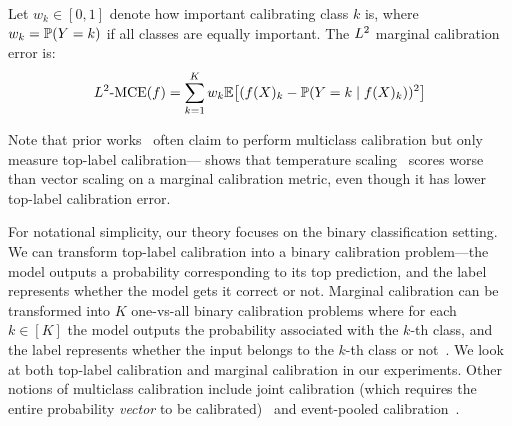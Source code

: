 \begin{definition}
\label{dfn:marginal-ce}
Let $w_k \in [0, 1]$ denote how important calibrating class $k$ is, where $w_k = \mathbb{P}(Y = k)$ if all classes are equally important. The $L^2$ marginal calibration error is:
\begin{align}
L^2\mbox{-MCE}(f) = \sum_{k = 1}^K w_k \mathbb{E}\big[ (f(X)_k - \mathbb{P}(Y = k \mid f(X)_k))^2 \big]
\end{align}
\end{definition}

Note that prior works~\cite{guo2017calibration, hendrycks2019anomaly, hendrycks2019pretraining} often claim to perform multiclass calibration but only measure top-label calibration---\cite{nixon2019calibration} shows that temperature scaling~\cite{guo2017calibration} scores worse than vector scaling on a marginal calibration metric, even though it has lower top-label calibration error.



For notational simplicity, our theory focuses on the binary classification setting. We can transform top-label calibration into a binary calibration problem---the model outputs a probability corresponding to its top prediction, and the label represents whether the model gets it correct or not. Marginal calibration can be transformed into $K$ one-vs-all binary calibration problems where for each $k \in [K]$ the model outputs the probability associated with the $k$-th class, and the label represents whether the input belongs to the $k$-th class or not~\cite{zadrozny2002transforming}. We look at both top-label calibration and marginal calibration in our experiments.
Other notions of multiclass calibration include joint calibration (which requires the entire probability \emph{vector} to be calibrated)~\cite{murphy1973vector, brocker2009decomposition} and event-pooled calibration~\cite{kuleshov2015calibrated}.



